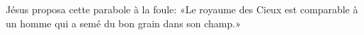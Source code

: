 \encetemps Jésus proposa cette parabole à la foule:
	«Le royaume des Cieux est comparable
	à un homme qui a semé du bon grain dans son champ.»

